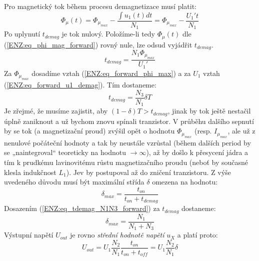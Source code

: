     Pro magnetický tok během procesu demagnetizace musí platit:
    \begin{equation}\label{ENZ:eq_phi_mag_forward}
     \Phi_\mu(t) = \Phi_{\mu_{max}} - \frac{\int{u_1(t)dt}}{N_1} = \Phi_{\mu_{max}} -
     \frac{U_1't}{N_1}
    \end{equation}
    Po uplynutí $t_{demag}$ je tok nulový. Položíme-li tedy $\Phi_\mu(t)$ dle
    (\ref{ENZ:eq_phi_mag_forward}) rovný nule, lze odsud vyjádřit $t_{demag}$.
    \begin{equation}\label{ENZ:eq_tdemag_forward}
     t_{demag} = \frac{N_1\Phi_{\mu_{max}}}{U_1'}
    \end{equation}
    Za $\Phi_{\mu_{max}}$ dosadíme vztah (\ref{ENZ:eq_forward_phi_max}) a za $U_1$  vztah
    (\ref{ENZ:eq_forward_u1_demag}). Tím dostaneme:
    \begin{equation}\label{ENZ:eq_tdemag_N1N3_forward}
     t_{demag} = \frac{N_3}{N_1}\delta T
    \end{equation}
    Je zřejmé, že musíme zajistit, aby $(1-\delta)T > t_{demag}$, jinak by tok ještě nestačil
    úplně zaniknout a už bychom znovu spínali tranzistor. V průběhu dalšího sepnutí by se tok (a
    magnetizační proud) zvýšil opět o hodnotu $\Phi_{\mu_{max}}$ (resp.  $I_{\mu_{max}}$, ale už z
    nenulové počáteční hodnoty a tak by neustále vzrůstal (během dalších period by se
    „naintegroval“ teoreticky na hodnotu $\rightarrow\infty$), až by došlo k přesycení jádra a tím
    k prudkému lavinovitému růstu magnetizačního proudu (neboť by současné klesla indukčnost
    $L_1$). Jev by postupoval až do zničení tranzistoru. Z výše uvedeného důvodu musí být
    maximální střída $\delta$ omezena na hodnotu:
    \begin{equation}\label{ENZ:eq_forward_delta_max}
    \delta_{max} = \frac{t_{on}}{t_{on}+t_{demag}}
    \end{equation}
    Dosazením (\ref{ENZ:eq_tdemag_N1N3_forward}) za $t_{demag}$ dostaneme:
    \begin{equation}\label{ENZ:eq_forward_delta_max1}
    \delta_{max} = \frac{N_1}{N_1+N_3}
    \end{equation}
    Výstupní napětí $U_{out}$ je rovno \emph{střední hodnotě napětí} $u_X$ a platí proto:
    \begin{equation}\label{ENZ:eq_uout_forward_delta}
    U_{out} = U_1\frac{N_2}{N_1}\frac{t_{on}}{t_{on} + t_{off}} = U_1\frac{N_2}{N_1}\delta
    \end{equation}
    
